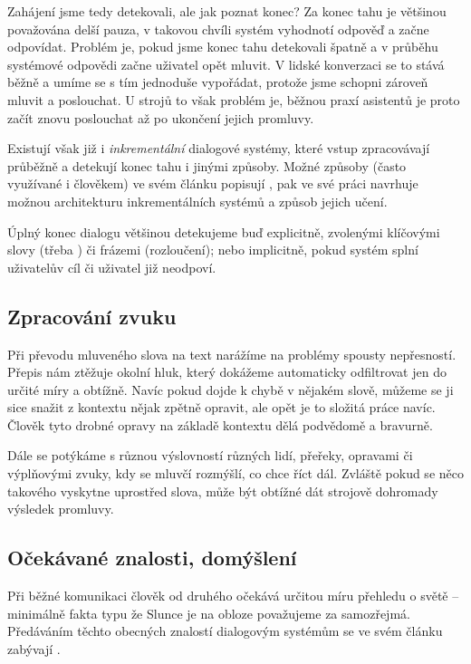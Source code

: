 Zahájení jsme tedy detekovali, ale jak poznat konec? Za konec tahu je
většinou považována delší pauza, v takovou chvíli systém vyhodnotí odpověď
a začne odpovídat. Problém je, pokud jsme konec tahu detekovali špatně a
v průběhu systémové odpovědi začne uživatel opět mluvit. V lidské konverzaci
se to stává běžně a umíme se s tím jednoduše vypořádat, protože jsme schopni
zároveň mluvit a poslouchat. U strojů to však problém je, běžnou praxí asistentů
je proto začít znovu poslouchat až po ukončení jejich promluvy.

Existují však již i \textit{inkrementální} dialogové systémy, které
vstup zpracovávají průběžně a detekují konec tahu i jinými způsoby.
Možné způsoby (často využívané i člověkem) ve svém článku popisují \citet{turn_taking_taxonomy_2015},
\citet{khouzaimi_turn-taking_2016} pak ve své práci navrhuje
možnou architekturu inkrementálních systémů a způsob jejich učení.

Úplný konec dialogu většinou detekujeme buď explicitně, zvolenými klíčovými
slovy (třeba ) či frázemi (rozloučení); nebo implicitně, pokud
systém splní uživatelův cíl či uživatel již neodpoví.

\subsection{Zpracování zvuku}

Při převodu mluveného slova na text narážíme na problémy spousty nepřesností.
Přepis nám ztěžuje okolní hluk, který dokážeme automaticky odfiltrovat jen do určité míry
a obtížně. Navíc pokud dojde k chybě v nějakém slově, můžeme se ji sice snažit
z kontextu nějak zpětně opravit, ale opět je to složitá práce navíc. Člověk
tyto drobné opravy na základě kontextu dělá podvědomě a bravurně.

Dále se potýkáme s různou výslovností různých lidí, přeřeky, opravami
či výplňovými zvuky, kdy se mluvčí rozmýšlí, co chce říct dál. Zvláště
pokud se něco takového vyskytne uprostřed slova, může být obtížné dát
strojově dohromady výsledek promluvy.

\subsection{Očekávané znalosti, domýšlení}

Při běžné komunikaci člověk od druhého očekává určitou míru přehledu o světě
-- minimálně fakta typu že Slunce je na obloze považujeme za samozřejmá.
Předáváním těchto obecných znalostí dialogovým systémům se ve svém článku
zabývají \citet{young_augmenting_2018}.

